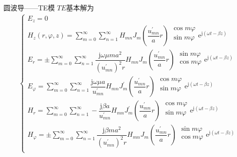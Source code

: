 \begin{frame}{圆波导——TE模}
    $TE$基本解为
    \begin{align*}
        \begin{cases}
            E_z=0                                     \\
            H_z(r,\varphi,z)=\sum\limits_{m=0}^{\infty}\sum\limits_{n=1}^{\infty}H_{mn}J_m\left(\dfrac{u_{mn}^{'}}{a}r\right)
            \begin{matrix*}
                \cos m\varphi\\
                \sin m\varphi\\
            \end{matrix*}
            \mathrm{e}^{\mathrm{j}(\omega t-\beta z)} \\
            E_r=\pm\sum\limits_{m=0}^{\infty}\sum\limits_{n=1}^{\infty}\dfrac{\mathrm{j}\omega\mu ma^2}{(u_{mn}^{'})^2r}H_{mn}J_m\left(\dfrac{u_{mn}^{'}}{a}r\right)
            \begin{matrix*}
                \sin m\varphi\\
                \cos m\varphi\\
            \end{matrix*}
            \mathrm{e}^{\mathrm{j}(\omega t-\beta z)} \\
            E_{\varphi}=\sum\limits_{m=0}^{\infty}\sum\limits_{n=1}^{\infty}\dfrac{\mathrm{j}\omega\mu a}{u_{mn}^{'}}H_{mn}J_m^{'}\left(\dfrac{u_{mn}^{'}}{a}r\right)
            \begin{matrix*}
                \cos m\varphi\\
                \sin m\varphi\\
            \end{matrix*}
            \mathrm{e}^{\mathrm{j}(\omega t-\beta z)} \\
            H_r=\sum\limits_{m=0}^{\infty}\sum\limits_{n=1}^{\infty}-\dfrac{\mathrm{j}\beta a}{u_{mn}^{'}}H_{mn}J_m^{'}\left(\dfrac{u_{mn}^{'}}{a}r\right)
            \begin{matrix*}
                \cos m\varphi\\
                \sin m\varphi\\
            \end{matrix*}
            \mathrm{e}^{\mathrm{j}(\omega t-\beta z)} \\
            H_{\varphi}=\pm\sum\limits_{m=0}^{\infty}\sum\limits_{n=1}^{\infty}\dfrac{\mathrm{j}\beta ma^2}{(u_{mn}^{'})^2r}H_{mn}J_m\left(\dfrac{u_{mn}^{'}}{a}r\right)
            \begin{matrix*}
                \sin m\varphi\\
                \cos m\varphi\\
            \end{matrix*}
            \mathrm{e}^{\mathrm{j}(\omega t-\beta z)} \\
        \end{cases}
    \end{align*}
\end{frame}

